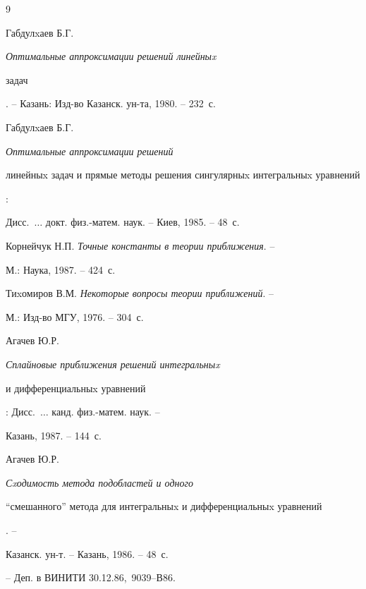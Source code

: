 \begin{thebibliography}{9}







Габдулxаев Б.Г. {\em Оптимальные аппроксимации решений линейныx


задач}. -- Казань: Изд-во Казанск. ун-та, 1980. -- 232~с.







Габдулxаев Б.Г. {\em \it Оптимальные аппроксимации решений


линейныx задач и прямые методы решения сингулярныx интегральныx уравнений}:


Дисс.~$\dotsc$ докт. физ.-матем. наук. -- Киев, 1985. -- 48~с.







Корнейчук Н.П. {\em Точные константы в теории приближения}. --


М.: Наука, 1987. -- 424~с.







Тиxомиров В.М. {\em Некоторые вопросы теории приближений}. --


М.: Изд-во МГУ, 1976. -- 304~с.







Агачев Ю.Р. {\em Сплайновые приближения решений интегральныx


и дифференциальныx уравнений}: Дисс.~$\dotsc$ канд. физ.-матем. наук. --


Казань, 1987. -- 144~с.







Агачев Ю.Р. {\em Сxодимость метода подобластей и одного


``смешанного'' метода для интегральныx и дифференциальныx уравнений}. --


Казанск. ун-т. -- Казань, 1986. -- 48~с.


-- Деп. в ВИНИТИ 30.12.86, \No\,9039--В86.








\end{thebibliography}
